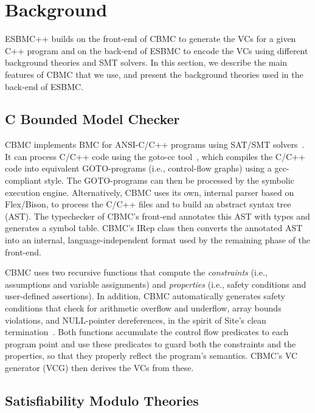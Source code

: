 \documentclass[a4paper]{llncs}
\begin{document}
\section{Background}

ESBMC++ builds on the front-end of CBMC to generate the VCs for a given C++ program
and on the back-end of ESBMC to encode the VCs using different background theories
and SMT solvers. In this section, we describe the main features of CBMC that we use,
and present the background theories used in the back-end of ESBMC.

\subsection{C Bounded Model Checker}
\label{02-CBoundedModelChecker}

CBMC implements BMC for ANSI-C/C++ programs using SAT/SMT solvers~\cite{Clarke04}.
It can process C/C++ code using the goto-cc tool~\cite{Wintersteiger09},
which compiles the C/C++ code into equivalent GOTO-programs (i.e., control-flow graphs)
using a gcc-compliant style. The GOTO-programs can then be processed by the symbolic
execution engine. Alternatively, CBMC uses its own, internal parser based on Flex/Bison,
to process the C/C++ files and to build an abstract syntax tree (AST). The typechecker
of CBMC's front-end annotates this AST with types and generates a symbol table. CBMC's
IRep class then converts the annotated AST into an internal, language-independent format
used by the remaining phase of the front-end.

CBMC uses two recursive functions that compute the \textit{constraints}
(i.e., assumptions and variable assignments) and \textit{properties}
(i.e., safety conditions and user-defined assertions). In addition,
CBMC automatically generates safety conditions that check for
arithmetic overflow and underflow, array bounds violations,
and NULL-pointer dereferences, in the spirit of Site's clean
termination~\cite{Sites74}. Both functions accumulate the control
flow predicates to each program point and use these predicates
to guard both the constraints and the properties, so that they properly
reflect the program's semantics. CBMC's VC generator (VCG) then
derives the VCs from these.

\subsection{Satisfiability Modulo Theories}
\label{02-SatisfiabilityModuloTheories}
\end{document}
